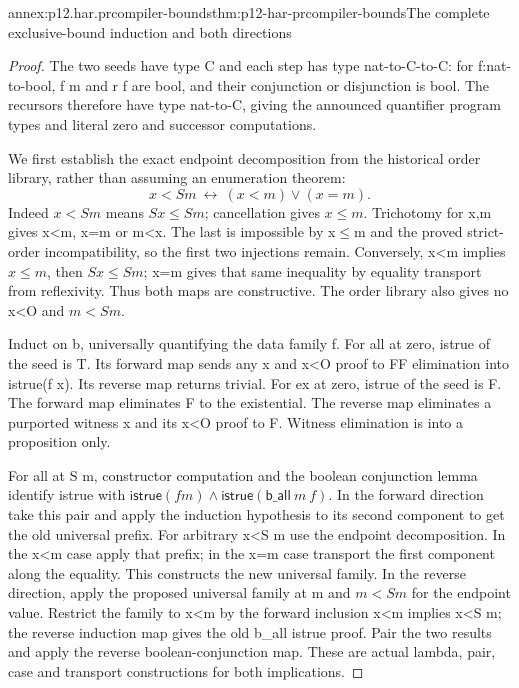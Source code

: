 \begin{annexitem}{annex:p12.har.prcompiler-bounds}{thm:p12-har-prcompiler-bounds}{The complete exclusive-bound induction and both directions}
\begin{proof}
The two seeds have type C and each step has type nat-to-C-to-C:
for f:nat-to-bool, f m and r f are bool, and their conjunction or
disjunction is bool. The recursors therefore have type nat-to-C,
giving the announced quantifier program types and literal zero and
successor computations.

We first establish the exact endpoint decomposition from the historical
order library, rather than assuming an enumeration theorem:
\[
 x<S m\ \leftrightarrow\ (x<m)\vee(x=m).
\]
Indeed \(x<S m\) means \(S x\le S m\); cancellation gives
\(x\le m\). Trichotomy for x,m gives x<m, x=m or m<x.
The last is impossible by x\(\le\)m and the proved strict-order
incompatibility, so the first two injections remain. Conversely, x<m
implies \(x\le m\), then \(S x\le S m\); x=m gives that same
inequality by equality transport from reflexivity. Thus both maps are
constructive. The order library also gives no x<O and \(m<S m\).

Induct on b, universally quantifying the data family f. For all at
zero, istrue of the seed is T. Its forward map sends any x and
x<O proof to FF elimination into istrue(f x). Its reverse map
returns trivial. For ex at zero, istrue of the seed is F.
The forward map eliminates F to the existential. The reverse map
eliminates a purported witness x and its x<O proof to F. Witness
elimination is into a proposition only.

For all at S m, constructor computation and the boolean conjunction
lemma identify istrue with
\(\mathsf{istrue}(f m)\wedge
 \mathsf{istrue}(\mathsf{b\_all}\ m\ f)\).
In the forward direction take this pair and apply the induction
hypothesis to its second component to get the old universal prefix.
For arbitrary x<S m use the endpoint decomposition. In the x<m
case apply that prefix; in the x=m case transport the first component
along the equality. This constructs the new universal family.
In the reverse direction, apply the proposed universal family at m
and \(m<S m\) for the endpoint value. Restrict the family to x<m
by the forward inclusion x<m implies x<S m; the reverse induction
map gives the old b\_all istrue proof. Pair the two results and apply
the reverse boolean-conjunction map. These are actual lambda, pair,
case and transport constructions for both implications.


\end{proof}
\end{annexitem}
